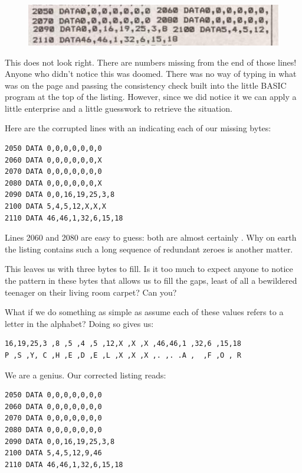\begin{figure}[H]
    \centering
    \begin{adjustbox}{width=7cm,center}
      \includegraphics[width=12cm]{src/listing/clipped.jpg}%
    \end{adjustbox}
\end{figure}

This does not look right. There are numbers missing from the end of those lines! Anyone who didn't notice
this was doomed. There was no way of typing in what was on the page and passing the consistency check
built into the little BASIC program at the top of the listing. However, since we did notice it we can apply
a little enterprise and a little guesswork to retrieve the situation.

Here are the corrupted lines with an  indicating each of our missing bytes:

\lstset{style=C64BasicStyle}
\begin{lstlisting}
2050 DATA 0,0,0,0,0,0,0 
2060 DATA 0,0,0,0,0,0,X
2070 DATA 0,0,0,0,0,0,0 
2080 DATA 0,0,0,0,0,0,X
2090 DATA 0,0,16,19,25,3,8 
2100 DATA 5,4,5,12,X,X,X
2110 DATA 46,46,1,32,6,15,18
\end{lstlisting}

Lines 2060 and 2080 are easy to guess: both are almost certainly . Why on earth the listing contains such
a long sequence of redundant zeroes is another matter. 

This leaves us with three bytes to fill. Is it too much to expect anyone to notice the pattern in these bytes that 
allows us to fill the gaps, least of all a bewildered teenager on their living room carpet? Can you? 


What if we do something as simple as assume each of these values refers to a letter in the alphabet? Doing so gives
us:

\begin{lstlisting}
16,19,25,3 ,8 ,5 ,4 ,5 ,12,X ,X ,X ,46,46,1 ,32,6 ,15,18
P ,S ,Y, C ,H ,E ,D ,E ,L ,X ,X ,X ,. ,. .A ,  ,F ,O , R
\end{lstlisting}

We are a genius. Our corrected listing reads:
\lstset{style=C64BasicStyle}
\begin{lstlisting}
2050 DATA 0,0,0,0,0,0,0 
2060 DATA 0,0,0,0,0,0,0
2070 DATA 0,0,0,0,0,0,0 
2080 DATA 0,0,0,0,0,0,0
2090 DATA 0,0,16,19,25,3,8 
2100 DATA 5,4,5,12,9,46
2110 DATA 46,46,1,32,6,15,18
\end{lstlisting}

